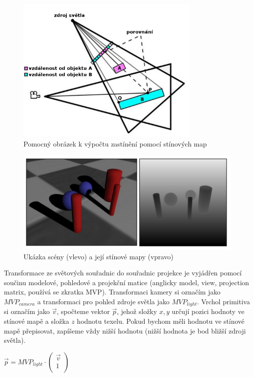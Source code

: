 \documentclass[11pt,twoside,a4paper]{book}
\begin{document}
\begin{center}
\begin{figure}[h]
\includegraphics[width=90mm]{figures/shadowmaps.png}
\caption{Pomocný obrázek k výpočtu zastínění pomocí stínových map}
\end{figure}
\end{center}

\begin{center}
\begin{figure}[h]
\includegraphics[width=120mm]{figures/shadowmap.png}
\caption{Ukázka scény (vlevo) a její stínové mapy (vpravo)}
\end{figure}
\end{center}

Transformace ze světových souřadnic do souřadnic projekce je vyjádřen pomocí součinu modelové, pohledové a projekční matice (anglicky model, view, projection matrix, používá se zkratka MVP). Transformaci kamery si označím jako $MVP_{camera}$ a transformaci pro pohled zdroje světla jako $MVP_{light}$. Vrchol primitiva si označím jako $\vec{v}$, spočteme vektor $\vec{p}$, jehož složky $x,y$ určují pozici hodnoty ve stínové mapě a složka $z$ hodnotu texelu. Pokud bychom měli hodnotu ve stínové mapě přepisovat, zapíšeme vždy nižší hodnotu (nižší hodnota je bod bližší zdroji světla).
\begin{center}
$\vec{p} = MVP_{light} \cdot \begin{pmatrix}\vec{v}\\ 1\\\end{pmatrix}$
\end{center}
\end{document}
